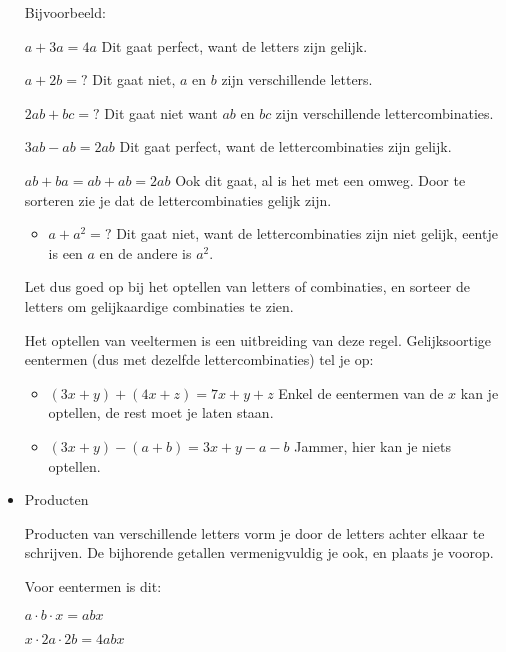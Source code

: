 \begin{itemize}
	\noindent Bijvoorbeeld:
	
	\textbullet{} $a+3a=4a$ Dit gaat perfect, want de letters zijn gelijk.
	
	\textbullet{} $a+2b=?$ Dit gaat niet, $a$ en $b$ zijn verschillende
	letters. 
	
	\textbullet{} $2ab+bc=?$ Dit gaat niet want $ab$ en $bc$ zijn verschillende
	lettercombinaties. 
	
	\textbullet{} $3ab-ab=2ab$ Dit gaat perfect, want de lettercombinaties
	zijn gelijk.
	
	\textbullet{} $ab+ba=ab+ab=2ab$ Ook dit gaat, al is het met een omweg.
	Door te sorteren zie je dat de lettercombinaties gelijk zijn.
	\begin{itemize}
		\item $a+a^{2}=?$ Dit gaat niet, want de lettercombinaties zijn niet gelijk,
		eentje is een $a$ en de andere is $a^{2}$.
	\end{itemize}
	Let dus goed op bij het optellen van letters of combinaties, en sorteer
	de letters om gelijkaardige combinaties te zien. 
	
	\noindent Het optellen van veeltermen is een uitbreiding van deze
	regel. Gelijksoortige eentermen (dus met dezelfde lettercombinaties)
	tel je op: 
	\begin{itemize}
		\item \noindent $(3x+y)+(4x+z)=7x+y+z$ Enkel de eentermen van de $x$ kan
		je optellen, de rest moet je laten staan. 
		\item \noindent $(3x+y)-(a+b)=3x+y-a-b$ Jammer, hier kan je niets optellen.
	\end{itemize}
	
	\item{Producten}
	
	Producten van verschillende letters vorm je door de letters achter
	elkaar te schrijven. De bijhorende getallen vermenigvuldig je ook,
	en plaats je voorop. 
	
	\noindent Voor eentermen is dit:
	
	\textbullet{} $a\cdot b\cdot x=abx$ 
	
	\textbullet{} $x\cdot2a\cdot2b=4abx$ \medskip{}
	

\end{itemize}
